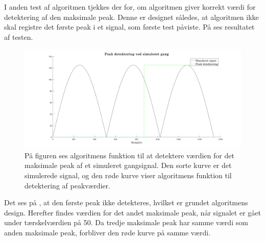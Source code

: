 I anden test af algoritmen tjekkes der for, om algoritmen giver korrekt værdi for detektering af den maksimale peak. Denne er designet således, at algoritmen ikke skal registre det første peak i et signal, som første test påviste. På  ses resultatet af testen.
\begin{figure}[H]
	\centering
	\includegraphics[width=.7\textwidth]{figures/cDesign/test_peak_gang.png}
	\caption{På figuren ses algoritmens funktion til at detektere værdien for det maksimale peak af et simuleret gangsignal. Den sorte kurve er det simulerede signal, og den røde kurve viser algoritmens funktion til detektering af peakværdier.}
	\label{fig:test_peak_gang}
\end{figure}\vspace{-0.25cm}
Det ses på , at den første peak ikke detekteres, hvilket er grundet algoritmens design. Herefter findes værdien for det andet maksimale peak, når signalet er gået under tærskelværdien på 50. Da tredje maksimale peak har samme værdi som anden maksimale peak, forbliver den røde kurve på samme værdi.

